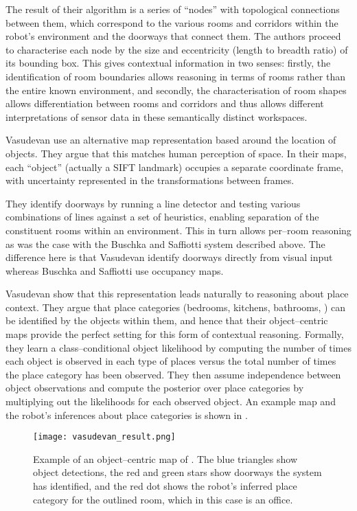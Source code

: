 The result of their algorithm is a series of ``nodes'' with topological
connections between them, which correspond to the various rooms and
corridors within the robot's environment and the doorways that connect
them. The authors proceed to characterise each node by the size and
eccentricity (length to breadth ratio) of its bounding box. This gives
contextual information in two senses: firstly, the identification of
room boundaries allows reasoning in terms of rooms rather than the
entire known environment, and secondly, the characterisation of room
shapes allows differentiation between rooms and corridors and thus
allows different interpretations of sensor data in these semantically
distinct workspaces.

Vasudevan \etal \cite{Vasudevan07} use an alternative map representation
based around the location of objects. They argue that this matches
human perception of space. In their maps, each ``object'' (actually a
SIFT landmark) occupies a separate coordinate frame, with uncertainty
represented in the transformations between frames.

They identify doorways by running a line detector and testing various
combinations of lines against a set of heuristics, enabling separation
of the constituent rooms within an environment. This in turn allows
per--room reasoning as was the case with the Buschka and Saffiotti
system described above. The difference here is that Vasudevan \etal
identify doorways directly from visual input whereas Buschka and
Saffiotti use occupancy maps.

Vasudevan \etal show that this representation leads naturally to
reasoning about place context. They argue that place categories
(bedrooms, kitchens, bathrooms, \etc) can be identified by the objects
within them, and hence that their object--centric maps provide the
perfect setting for this form of contextual reasoning. Formally, they
learn a class--conditional object likelihood by computing the number
of times each object is observed in each type of places versus the
total number of times the place category has been observed. They then
assume independence between object observations and compute the
posterior over place categories by multiplying out the likelihoods for
each observed object. An example map and the robot's inferences about
place categories is shown in .

\begin{figure}[tb]
\centering
\texttt{[image: vasudevan\_result.png]}
\caption{Example of an object--centric map of \cite{Vasudevan07}. The
  blue triangles show object detections, the red and green stars show
  doorways the system has identified, and the red dot shows the
  robot's inferred place category for the outlined room, which in this
  case is an office.}
\label{fig:vasudevan-result}
\end{figure}





